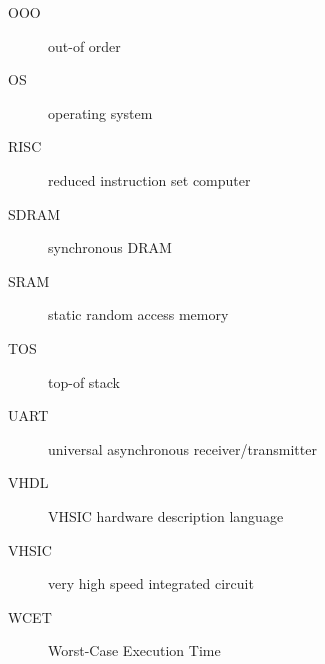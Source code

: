 \documentclass[%
    10pt,
    headinclude, footexclude,
    openright, %
    notitlepage,
    cleardoubleempty,
    headsepline,
    pointlessnumbers,
    bibtotoc, idxtotoc,
    ]{scrbook}
\begin{document}
\begin{description}
\item [OOO] out-of order
\item [OS] operating system
\item [RISC] reduced instruction set computer
\item [SDRAM] synchronous DRAM
\item [SRAM] static random access memory
\item [TOS] top-of stack
\item [UART] universal asynchronous receiver/transmitter
\item [VHDL] VHSIC hardware description language
\item [VHSIC] very high speed integrated circuit
\item [WCET] Worst-Case Execution Time
\end{description}






\hypertarget{index}{}
\printindex
\end{document}
